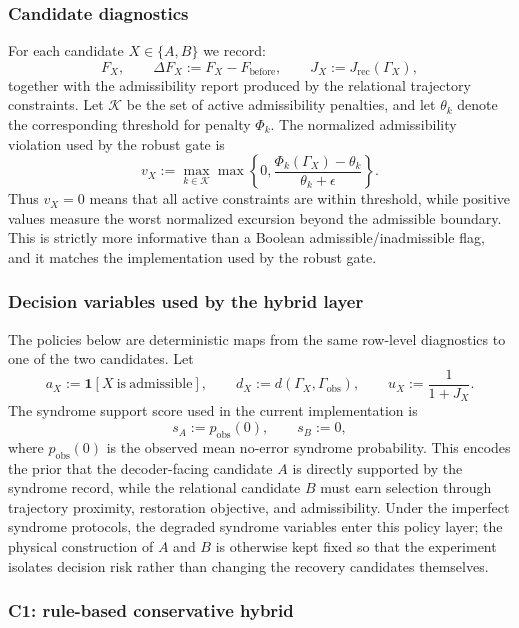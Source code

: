 \documentclass[11pt,a4paper]{article}
\theoremstyle{definition}
\theoremstyle{remark}
\begin{document}
\subsubsection*{Candidate diagnostics}

For each candidate $X\in\{A,B\}$ we record:
\[
F_X,\qquad
\Delta F_X:=F_X-F_{\mathrm{before}},\qquad
J_X:=J_{\mathrm{rec}}(\Gamma_X),
\]
together with the admissibility report produced by the relational trajectory
constraints.  Let $\mathcal{K}$ be the set of active admissibility penalties, and let
$\theta_k$ denote the corresponding threshold for penalty $\Phi_k$.  The normalized
admissibility violation used by the robust gate is
\[
v_X
:=
\max_{k\in\mathcal{K}}
\max\!\left\{0,\frac{\Phi_k(\Gamma_X)-\theta_k}{\theta_k+\epsilon}\right\}.
\]
Thus $v_X=0$ means that all active constraints are within threshold, while positive
values measure the worst normalized excursion beyond the admissible boundary.  This
is strictly more informative than a Boolean admissible/inadmissible flag, and it
matches the implementation used by the robust gate.

\subsubsection*{Decision variables used by the hybrid layer}

The policies below are deterministic maps from the same row-level diagnostics to one
of the two candidates.  Let
\[
a_X:=\mathbf{1}[X\ \mathrm{is\ admissible}],
\qquad
d_X:=d(\Gamma_X,\Gamma_{\mathrm{obs}}),
\qquad
u_X:=\frac{1}{1+J_X}.
\]
The syndrome support score used in the current implementation is
\[
s_A:=p_{\mathrm{obs}}(0),
\qquad
s_B:=0,
\]
where $p_{\mathrm{obs}}(0)$ is the observed mean no-error syndrome probability.  This
encodes the prior that the decoder-facing candidate $A$ is directly supported by the
syndrome record, while the relational candidate $B$ must earn selection through
trajectory proximity, restoration objective, and admissibility.  Under the imperfect
syndrome protocols, the degraded syndrome variables enter this policy layer; the
physical construction of $A$ and $B$ is otherwise kept fixed so that the experiment
isolates decision risk rather than changing the recovery candidates themselves.

\subsubsection*{C1: rule-based conservative hybrid}
\end{document}
